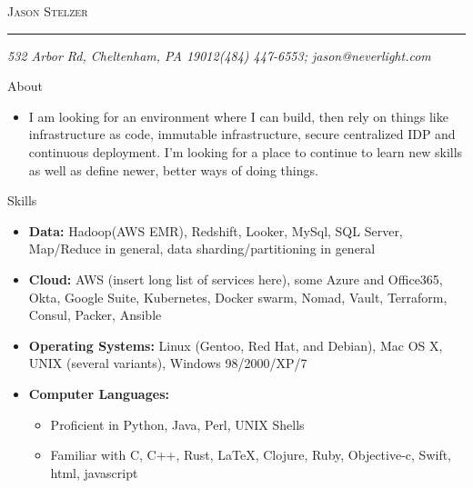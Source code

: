 \documentclass[11pt,oneside]{article}
\makeatletter
\newcommand{\name}{Jason Stelzer}
\newcommand{\addr}{532 Arbor Rd, Cheltenham, PA 19012}
\newcommand{\phone}{(484) 447-6553}
\newcommand{\email}{jason@neverlight.com}
\newcommand{\bigname}[1]{
        \begin{center}\fontfamily{phv}\selectfont\Huge\scshape#1\end{center}
}
\newenvironment{ressection}[1]{
        \vspace{4pt}
        {\fontfamily{phv}\selectfont\Large#1}
        \begin{itemize}
        \vspace{3pt}
}{
        \end{itemize}
}
\newcommand{\resitem}[1]{
        \vspace{-4pt}
        \item \begin{flushleft} #1 \end{flushleft}
}
\newcommand{\ressubitem}[1]{
        \vspace{-1pt}
        \item \begin{flushleft} #1 \end{flushleft}
}
\newenvironment{reslist}[1]{
        \resitem{\textbf{#1}}
        \vspace{-5pt}
        \begin{itemize}
}{
        \end{itemize}
}
\makeatother
\begin{document}
 \selectfont

\bigname{\name}

\vspace{-8pt} \rule{\textwidth}{1pt}

\vspace{-1pt} {\small\itshape \addr \hfill \phone; \email}

\vspace{8 pt}

\begin{ressection}{About}

  \resitem{I am looking for an environment where I can build, then rely on things like infrastructure as code, immutable infrastructure, secure centralized IDP and continuous deployment. I'm looking for a place to continue to learn new skills as well as define newer, better ways of doing things.}
  
\end{ressection}


\begin{ressection}{Skills}

  \resitem{\textbf{Data:} Hadoop(AWS EMR), Redshift, Looker, MySql, SQL Server, Map/Reduce in general, data sharding/partitioning in general}

  \resitem{\textbf{Cloud:} AWS (insert long list of services here), some Azure and Office365, Okta, Google Suite, Kubernetes, Docker swarm, Nomad, Vault, Terraform, Consul, Packer, Ansible }

  \resitem{\textbf{Operating Systems:} Linux (Gentoo, Red Hat, and
    Debian), Mac OS X, UNIX (several variants), Windows 98/2000/XP/7}

  \begin{reslist}{Computer Languages:}

    \ressubitem{Proficient in Python, Java, Perl,  UNIX Shells}

    \ressubitem{Familiar with C, C++, Rust, \LaTeX, Clojure, Ruby, Objective-c, Swift, html, javascript}

  \end{reslist}



\end{ressection}
\end{document}
